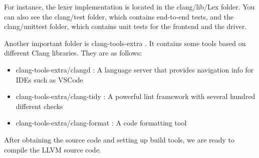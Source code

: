 For instance, the lexer implementation is located in the clang/lib/Lex folder. You can also see the clang/test folder, which contains end-to-end tests, and the clang/unittest folder, which contains unit tests for the frontend and the driver.

Another important folder is clang-tools-extra . It contains some tools based on different Clang libraries. They are as follows:


\begin{itemize}
\item
clang-tools-extra/clangd : A language server that provides navigation info for IDEs such as VSCode

\item
clang-tools-extra/clang-tidy : A powerful lint framework with several hundred different checks

\item
clang-tools-extra/clang-format : A code formatting tool
\end{itemize}

After obtaining the source code and setting up build tools, we are ready to compile the LLVM source code.























